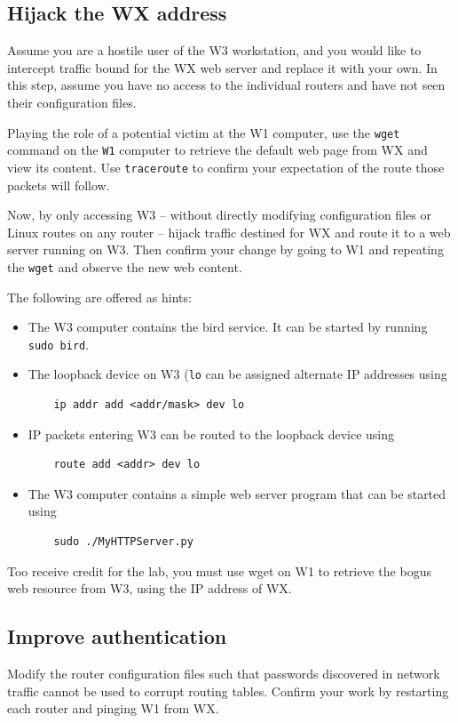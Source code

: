 \subsection{Hijack the WX address}
Assume you are a hostile user of the W3 workstation, and you would like to intercept traffic bound for the WX web server
and replace it with your own.  In this step, assume you have no access to the individual routers and have not seen
their configuration files.

Playing the role of a potential victim at the W1 computer, use the {\tt wget} command on the {\tt W1} 
computer to retrieve the default web page from WX and view its content.
Use {\tt traceroute} to confirm your expectation of the route those packets will follow.

Now, by only accessing W3 -- without directly modifying configuration files or Linux routes on any router -- hijack traffic destined
for WX and route it to a web server running on W3.  Then confirm your change by going to W1 and repeating the {\tt wget} and 
observe the new web content.

The following are offered as hints:
\begin{itemize}
\item The W3 computer contains the bird service.  It can be started by running {\tt sudo bird}.
\item The loopback device on W3 ({\tt lo} can be assigned alternate IP addresses using 
\begin{verbatim}
    ip addr add <addr/mask> dev lo
\end{verbatim}
\item IP packets entering W3 can be routed to the loopback device using
\begin{verbatim}
    route add <addr> dev lo
\end{verbatim}
\item The W3 computer contains a simple web server program that can be started using
\begin{verbatim}
    sudo ./MyHTTPServer.py
\end{verbatim}

\end{itemize}
Too receive credit for the lab, you must use wget on W1 to retrieve the bogus web resource from W3, using the IP address of WX.

\subsection{Improve authentication}
Modify the router configuration files such that passwords discovered in network traffic cannot be used to corrupt 
routing tables.  Confirm your work by restarting each router and pinging W1 from WX.
